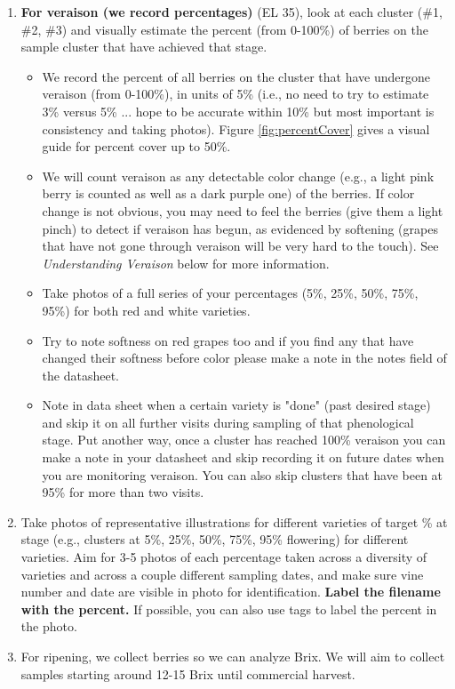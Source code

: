 \documentclass[11pt,letter]{article}
\newenvironment{smitemize}{
\begin{itemize}
  \setlength{\itemsep}{0pt}
  \setlength{\parskip}{0.8pt}
  \setlength{\parsep}{0pt}}
{\end{itemize}
}
\begin{document}
\begin{enumerate}
\item {\bf For veraison (we record percentages)} (EL 35), look at each cluster (\#1, \#2, \#3) and visually estimate the percent (from 0-100\%) of berries on the sample cluster that have achieved that stage. 
	\begin{smitemize}
       \item We record the percent of all berries on the cluster that have undergone veraison (from 0-100\%), in units of 5\% (i.e., no need to try to estimate 3\% versus 5\% ... hope to be accurate within 10\% but most important is consistency and taking photos).  Figure \ref{fig:percentCover} gives a visual guide for percent cover up to 50\%.
	\item We will count veraison as any detectable color change (e.g., a light pink berry is counted as well as a dark purple one) of the berries. If color change is not obvious, you may need to feel the berries (give them a light pinch) to detect if veraison has begun, as evidenced by softening (grapes that have not gone through veraison will be very hard to the touch). See \textit{Understanding Veraison} below for more information.
	\item Take photos of a full series of your percentages (5\%, 25\%, 50\%, 75\%, 95\%) for both red and white varieties. 
	\item Try to note softness on red grapes too and if you find any that have changed their softness before color please make a note in the notes field of the datasheet.
	\item Note in data sheet when a certain variety is "done" (past desired stage) and skip it on all further visits during sampling of that phenological stage. Put another way, once a cluster has reached 100\% veraison you can make a note in your datasheet and skip recording it on future dates when you are monitoring veraison. You can also skip clusters that have been at 95\% for more than two visits.
	\end{smitemize}
\item Take photos of representative illustrations for different varieties of target \% at stage (e.g., clusters at 5\%, 25\%, 50\%, 75\%, 95\% flowering) for different varieties. Aim for 3-5 photos of each percentage taken across a diversity of varieties and across a couple different sampling dates, and make sure vine number and date are visible in photo for identification. {\bf Label the filename with the percent.} If possible, you can also use tags to label the percent in the photo. 
\item For ripening, we collect berries so we can analyze Brix. We will aim to collect samples starting around 12-15 Brix until commercial harvest. \\
	

\end{enumerate}
\end{document}

